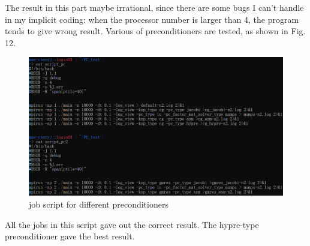 \documentclass[a4paper,10pt]{article}
\begin{document}
The result in this part maybe irrational, since there are some bugs I can't handle in my implicit coding: when the processor number is larger than 4, the program tends to give wrong result. Various of preconditioners are tested, as shown in Fig. 12.
\begin{figure}[h]
	\centering
	\includegraphics[scale=0.8]{pc_script.png}
	\caption{job script for different preconditioners}
\end{figure}
All the jobs in this script gave out the correct result. The hypre-type preconditioner gave the best result.
\end{document}
